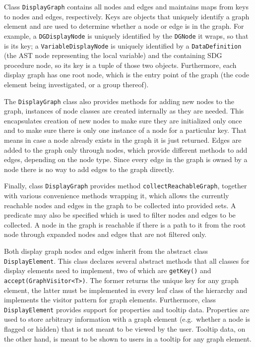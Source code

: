 Class \lstinline|DisplayGraph| contains all nodes and edges and maintains maps from keys to nodes and edges, 
respectively. Keys are objects that uniquely identify a graph element and are used to determine whether a node or edge 
is in the graph. For example, a \lstinline|DGDisplayNode| is uniquely identified by the \lstinline|DGNode| it wraps, so 
that is its key; a \lstinline|VariableDisplayNode| is uniquely identified by a \lstinline|DataDefinition| (the AST node 
representing the local variable) and the containing SDG procedure node, so its key is a tuple of those two objects. 
Furthermore, each display graph has one root node, which is the entry point of the graph (the code element being 
investigated, or a group thereof).

The \lstinline|DisplayGraph| class also provides methods for adding new nodes to the graph, instances of node classes 
are created internally as they are needed. This encapsulates creation of new nodes to make sure they are initialized 
only once and to make sure there is only one instance of a node for a particular key. That means in case a node already 
exists in the graph it is just returned. Edges are added to the graph only through nodes, which provide different 
methods to add edges, depending on the node type. Since every edge in the graph is owned by a node there is no way to 
add edges to the graph directly.

Finally, class \lstinline|DisplayGraph| provides method \lstinline|collectReachableGraph|, together with various 
convenience methods wrapping it, which allows the currently reachable nodes and edges in the graph to be collected into 
provided sets. A predicate may also be specified which is used to filter nodes and edges to be collected. A node in the 
graph is reachable if there is a path to it from the root node through expanded nodes and edges that are not filtered 
only.

Both display graph nodes and edges inherit from the abstract class \lstinline|DisplayElement|. This class declares 
several abstract methods that all classes for display elements need to implement, two of which are \lstinline|getKey()| 
and \lstinline|accept(GraphVisitor<T>)|. The former returns the unique key for any graph element, the latter must be 
implemented in every leaf class of the hierarchy and implements the visitor pattern \cite[pp.~331--344]{designpatterns} 
for graph elements. Furthermore, class \lstinline|DisplayElement| provides support for properties and tooltip data. 
Properties are used to store arbitrary information with a graph element (e.g.\ whether a node is flagged or hidden) 
that is not meant to be viewed by the user. Tooltip data, on the other hand, is meant to be shown to users in a tooltip 
for any graph element.

